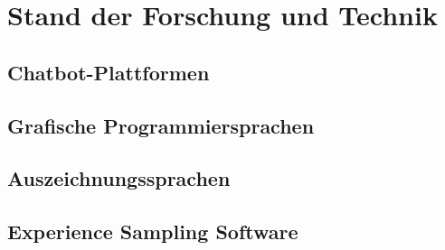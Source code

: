 
\chapter{Stand der Forschung und Technik}
\label{ch:Analysis}

\section{Chatbot-Plattformen}

\section{Grafische Programmiersprachen}

\section{Auszeichnungssprachen}

\section{Experience Sampling Software}


